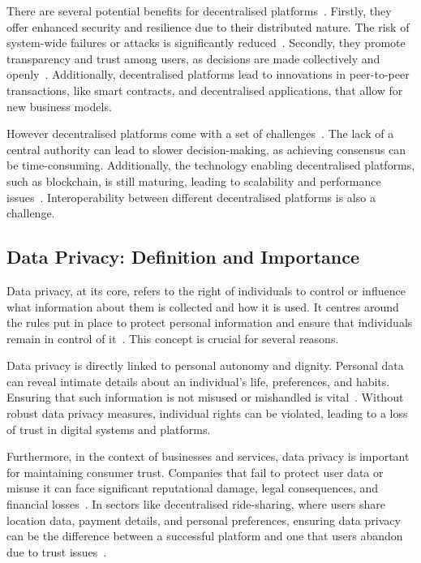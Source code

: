 There are several potential benefits for decentralised platforms~\cite{Hasan.2022}. Firstly, they offer enhanced security and resilience due to their distributed nature. The risk of system-wide failures or attacks is significantly reduced~\cite{Maffiola.2022}. Secondly, they promote transparency and trust among users, as decisions are made collectively and openly~\cite{Hasan.2022}. Additionally, decentralised platforms lead to innovations in peer-to-peer transactions, like smart contracts, and decentralised applications, that allow for new business models.

However decentralised platforms come with a set of challenges~\cite{Hasan.2022}. The lack of a central authority can lead to slower decision-making, as achieving consensus can be time-consuming. Additionally, the technology enabling decentralised platforms, such as blockchain, is still maturing, leading to scalability and performance issues~\cite{Hasan.2022}. Interoperability between different decentralised platforms is also a challenge.

\subsection{Data Privacy: Definition and Importance}
Data privacy, at its core, refers to the right of individuals to control or influence what information about them is collected and how it is used. It centres around the rules put in place to protect personal information and ensure that individuals remain in control of it~\cite{Covert.2020}. This concept is crucial for several reasons.

Data privacy is directly linked to personal autonomy and dignity. Personal data can reveal intimate details about an individual's life, preferences, and habits. Ensuring that such information is not misused or mishandled is vital~\cite{Covert.2020}. Without robust data privacy measures, individual rights can be violated, leading to a loss of trust in digital systems and platforms.

Furthermore, in the context of businesses and services, data privacy is important for maintaining consumer trust. Companies that fail to protect user data or misuse it can face significant reputational damage, legal consequences, and financial losses~\cite{Li.2019}. In sectors like decentralised ride-sharing, where users share location data, payment details, and personal preferences, ensuring data privacy can be the difference between a successful platform and one that users abandon due to trust issues~\cite{Li.2019}.

